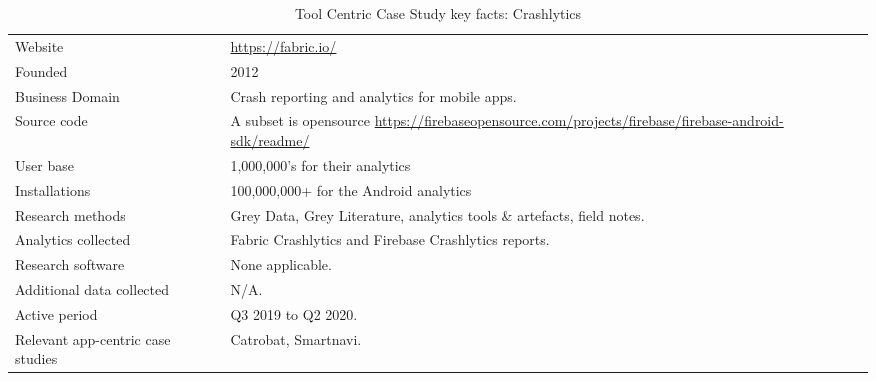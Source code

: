 {\renewcommand{\arraystretch}{0.8}%
\begin{table*}[htbp!]
    \centering
    \small
    \setlength{\tabcolsep}{6pt}
    \begin{tabular}{lp{9cm}}
       \toprule
       Website &\url{https://fabric.io/} \\
       Founded & 2012 \\
       Business Domain & Crash reporting and analytics for mobile apps. \\
       Source code  & A subset is opensource \url{https://firebaseopensource.com/projects/firebase/firebase-android-sdk/readme/} \\
       \midrule
       User base & 1,000,000's for their analytics\footnotemark \\ %
       Installations & 100,000,000+ for the Android analytics \\ %
       \midrule
       Research methods &Grey Data, Grey Literature, analytics tools \& artefacts, field notes. \\
       Analytics collected &Fabric Crashlytics and Firebase Crashlytics reports. \\
       Research software & None applicable. \\
       Additional data collected &N/A. \\
       Active period & Q3 2019 to Q2 2020. \\
       Relevant app-centric case studies & Catrobat, Smartnavi. \\
       \bottomrule
    \end{tabular}
    \caption{Tool Centric Case Study key facts: Crashlytics}
    \label{tab:crashlytics_case_study_anaytics_overview}
\end{table*}
}


